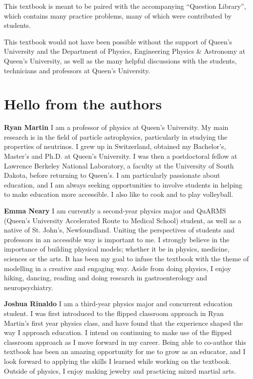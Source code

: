 This textbook is meant to be paired with the accompanying ``Question Library'', which contains many practice problems, many of which were contributed by students.

This textbook would not have been possible without the support of Queen's University and the Department of Physics, Engineering Physics \& Astronomy at Queen's University, as well as the many helpful discussions with the students, technicians and professors at Queen's University.

\section*{Hello from the authors}
\textbf{Ryan Martin} I am a professor of physics at Queen's University. My main research is in the field of particle astrophysics, particularly in studying the properties of neutrinos. I grew up in Switzerland, obtained my Bachelor's, Master's and Ph.D. at Queen's University. I was then a postdoctoral fellow at Lawrence Berkeley National Laboratory, a faculty at the University of South Dakota, before returning to Queen's. I am particularly passionate about education, and I am always seeking opportunities to involve students in helping to make education more accessible. I also like to cook and to play volleyball.

\textbf{Emma Neary} I am currently a second-year physics major and QuARMS (Queen's University Accelerated Route to Medical School) student, as well as a native of St. John's, Newfoundland. Uniting the perspectives of students and professors in an accessible way is important to me. I strongly believe in the importance of building physical models; whether it be in physics, medicine, sciences or the arts. It has been my goal to infuse the textbook with the theme of modelling in a creative and engaging way. Aside from doing physics, I enjoy hiking, dancing, reading and doing research in gastroenterology and neuropsychiatry.

\textbf{Joshua Rinaldo} I am a third-year physics major and concurrent education student. I was first introduced to the flipped classroom approach in Ryan Martin's first year physics class, and have found that the experience shaped the way I approach education. I intend on continuing to make use of the flipped classroom approach as I move forward in my career. Being able to co-author this textbook has been an amazing opportunity for me to grow as an educator, and I look forward to applying the skills I learned while working on the textbook. Outside of physics, I enjoy making jewelry and practicing mixed martial arts.

